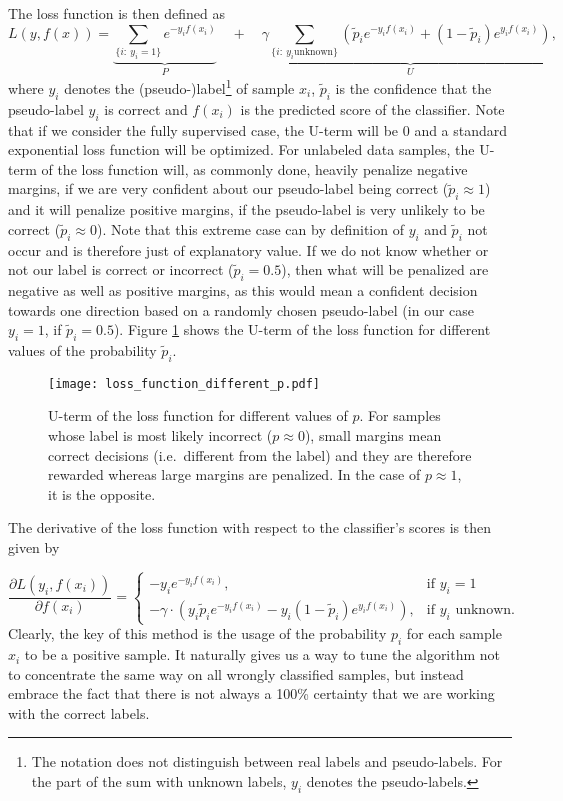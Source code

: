 The loss function is then defined as
\begin{equation*}
L(y,f(x)) = \underbrace{\sum_{\{i :~ y_i = 1\}} e^{-y_i f(x_i)}}_{P} \quad + \quad \gamma\underbrace{\sum_{\{i:~ y_i \text{unknown}\}} \left( \tilde p_i e^{-y_i f(x_i)} + (1-\tilde p_i) e^{y_i f(x_i)}\right)}_{U}, 
\end{equation*}
where $y_i$ denotes the (pseudo-)label\footnote{The notation does not distinguish between real labels and pseudo-labels. For the part of the sum with unknown labels, $y_i$ denotes the pseudo-labels.} of sample $x_i$, $\tilde p_i$ is the confidence that the pseudo-label $y_i$ is correct and $f(x_i)$ is the predicted score of the classifier.
Note that if we consider the fully supervised case, the U-term will be 0 and a standard exponential loss function will be optimized. 
For unlabeled data samples, the U-term of the loss function will, as commonly done, heavily penalize negative margins, if we are very confident about our pseudo-label being correct ($\tilde p_i \approx 1$) and it will penalize positive margins, if the pseudo-label is very unlikely to be correct ($\tilde p_i \approx 0$). 
Note that this extreme case can by definition of $y_i$ and $\tilde p_i$ not occur and is therefore just of explanatory value. 
If we do not know whether or not our label is correct or incorrect ($\tilde p_i = 0.5$), then what will be penalized are negative as well as positive margins, as this would mean a confident decision towards one direction based on a randomly chosen pseudo-label (in our case $y_i = 1$, if $\tilde p_i=0.5$). Figure \ref{fig:ourlossfunctionplot} shows the U-term of the loss function for different values of the probability $\tilde p_i$.

\begin{figure}[ht]
  \centering
  \texttt{[image: loss\_function\_different\_p.pdf]}	
  \caption{U-term of the loss function for different values of $p$. For samples whose label is most likely incorrect ($p \approx 0$), small margins mean correct decisions (i.e.\ different from the label) and they are therefore rewarded whereas large margins are penalized. In the case of $p \approx 1$, it is the opposite.}
  \label{fig:ourlossfunctionplot}
\end{figure}

The derivative of the loss function with respect to the classifier's scores is then given by 

\begin{equation*}
 \frac{\partial L(y_i,f(x_i))}{\partial f(x_i)} = 
    \begin{cases}
	-y_i e^{-y_i f(x_i)}, & \text{if $y_i = 1$}\\
	-\gamma \cdot \left(y_i \tilde p_i e^{-y_i f(x_i)} - y_i (1 - \tilde p_i) e^{y_i f(x_i)} \right), & \text{if $y_i$ unknown.}
      \end{cases}
\end{equation*}
Clearly, the key of this method is the usage of the probability $p_i$ for each sample $x_i$ to be a positive sample. 
It naturally gives us a way to tune the algorithm not to concentrate the same way on all wrongly classified samples, but instead embrace the fact that there is not always a 100\% certainty that we are working with the correct labels.

